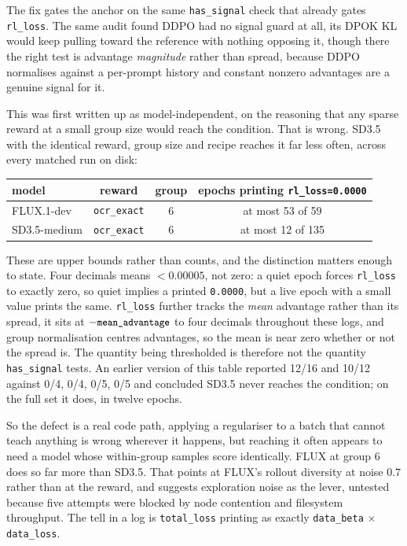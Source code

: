 \documentclass[11pt]{article}
\newcommand{\code}[1]{\texttt{\small #1}}
\begin{document}
The fix gates the anchor on the same \code{has\_signal} check that already gates \code{rl\_loss}. The same audit found DDPO had no signal guard at all, its DPOK KL would keep pulling toward the reference with nothing opposing it, though there the right test is advantage \emph{magnitude} rather than spread, because DDPO normalises against a per-prompt history and constant nonzero advantages are a genuine signal for it.

This was first written up as model-independent, on the reasoning that any sparse reward at a small group size would reach the condition. That is wrong. SD3.5 with the identical reward, group size and recipe reaches it far less often, across every matched run on disk:

\begin{center}
\begin{tabular}{lccc}
\toprule
model & reward & group & epochs printing \code{rl\_loss=0.0000} \\
\midrule
FLUX.1-dev & \code{ocr\_exact} & 6 & at most 53 of 59 \\
SD3.5-medium & \code{ocr\_exact} & 6 & at most 12 of 135 \\
\bottomrule
\end{tabular}
\end{center}

\noindent These are upper bounds rather than counts, and the distinction matters enough to state. Four decimals means $<0.00005$, not zero: a quiet epoch forces \code{rl\_loss} to exactly zero, so quiet implies a printed \code{0.0000}, but a live epoch with a small value prints the same. \code{rl\_loss} further tracks the \emph{mean} advantage rather than its spread, it sits at $-\code{mean\_advantage}$ to four decimals throughout these logs, and group normalisation centres advantages, so the mean is near zero whether or not the spread is. The quantity being thresholded is therefore not the quantity \code{has\_signal} tests. An earlier version of this table reported 12/16 and 10/12 against 0/4, 0/4, 0/5, 0/5 and concluded SD3.5 never reaches the condition; on the full set it does, in twelve epochs.

\noindent So the defect is a real code path, applying a regulariser to a batch that cannot teach anything is wrong wherever it happens, but reaching it often appears to need a model whose within-group samples score identically. FLUX at group 6 does so far more than SD3.5. That points at FLUX's rollout diversity at noise $0.7$ rather than at the reward, and suggests exploration noise as the lever, untested because five attempts were blocked by node contention and filesystem throughput. The tell in a log is \code{total\_loss} printing as exactly \code{data\_beta} $\times$ \code{data\_loss}.
\end{document}
